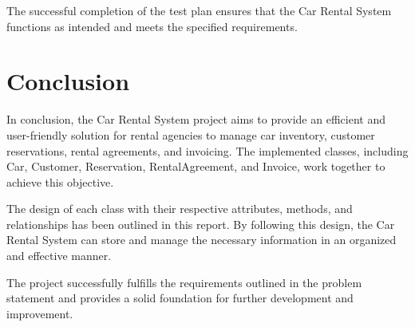 \documentclass{article}
\begin{document}
The successful completion of the test plan ensures that the Car Rental System functions as intended and meets the specified requirements.
\section{Conclusion}
In conclusion, the Car Rental System project aims to provide an efficient and user-friendly solution for rental agencies to manage car inventory, customer reservations, rental agreements, and invoicing. The implemented classes, including Car, Customer, Reservation, RentalAgreement, and Invoice, work together to achieve this objective.

The design of each class with their respective attributes, methods, and relationships has been outlined in this report. By following this design, the Car Rental System can store and manage the necessary information in an organized and effective manner.

The project successfully fulfills the requirements outlined in the problem statement and provides a solid foundation for further development and improvement.
\end{document}
